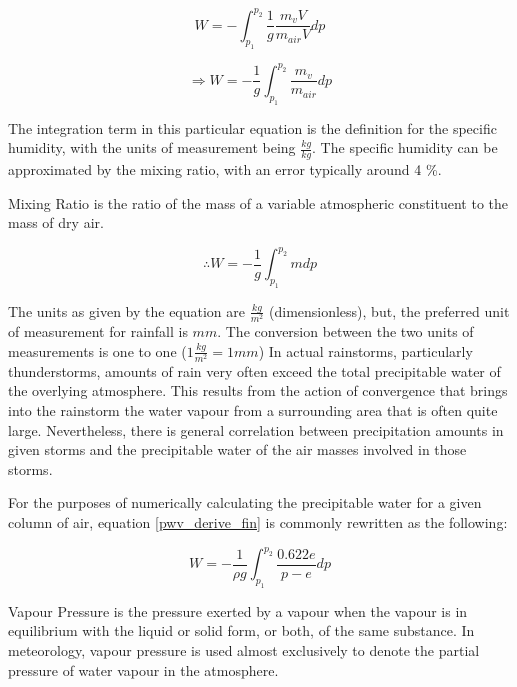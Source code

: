 \begin{equation}
    W = -\int_{p_1}^{p_2} \frac{1}{g} \frac{m_v V}{m_{air} V} dp
\end{equation}

\begin{equation}
    \Rightarrow W = - \frac{1}{g} \int_{p_1}^{p_2} \frac{m_v}{m_{air}} dp
\end{equation}

The integration term in this particular equation is the definition for the specific humidity, with the units of measurement being $\frac{kg}{kg}$. The specific humidity can be approximated by the mixing ratio, with an error typically around 4 \%\cite{pwv_def}.

\begin{definition}
Mixing Ratio is the ratio of the mass of a variable atmospheric constituent to the mass of dry air.
\end{definition}

\begin{equation}
    \label{pwv_derive_fin}
    \therefore W = -\frac{1}{g} \int_{p_1}^{p_2} m dp
\end{equation}

The units as given by the equation are $\frac{kg}{m^2}$ (dimensionless), but, the preferred unit of measurement for rainfall is $mm$. The conversion between the two units of measurements is one to one ($1 \frac{kg}{m^2} = 1 mm$) In actual rainstorms, particularly thunderstorms, amounts of rain very often exceed the total precipitable water of the overlying atmosphere. This results from the action of convergence that brings into the rainstorm the water vapour from a surrounding area that is often quite large. Nevertheless, there is general correlation between precipitation amounts in given storms and the precipitable water of the air masses involved in those storms\cite{problems_with_pwv}.

For the purposes of numerically calculating the precipitable water for a given column of air, equation \ref{pwv_derive_fin} is commonly rewritten as the following:

\begin{equation}
    \label{pwv}
    W = -\frac{1}{\rho g} \int_{p_1}^{p_2} \frac{0.622 e}{p - e} dp
\end{equation}

\begin{definition}
Vapour Pressure is the pressure exerted by a vapour when the vapour is in equilibrium with the liquid or solid form, or both, of the same substance. In meteorology, vapour pressure is used almost exclusively to denote the partial pressure of water vapour in the atmosphere.
\end{definition}

